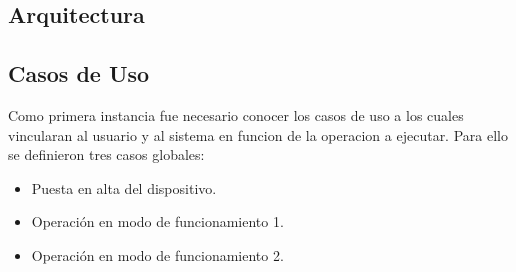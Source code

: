 \subsection{Arquitectura}



\subsection{Casos de Uso}

Como primera instancia fue necesario conocer los casos de uso a los cuales vincularan al usuario y al sistema en funcion de la operacion a ejecutar. Para ello se definieron tres casos globales:

\begin{itemize}
	\item Puesta en alta del dispositivo.
	\item Operación en modo de funcionamiento 1.
	\item Operación en modo de funcionamiento 2.
\end{itemize}



